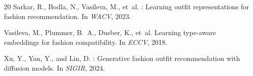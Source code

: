 \documentclass[10pt,twocolumn]{article}
\begin{document}
\begin{thebibliography}{20}
Sarkar, R., Bodla, N., Vasileva, M., et~al.
: Learning outfit representations for fashion
recommendation.
\newblock In \emph{WACV}, 2023.

Vasileva, M., Plummer, B.~A., Dusber, K., et~al.
\newblock Learning type-aware embeddings for fashion compatibility.
\newblock In \emph{ECCV}, 2018.

Xu, Y., Yan, Y., and Lin, D.
: Generative fashion outfit recommendation with
diffusion models.
\newblock In \emph{SIGIR}, 2024.

\end{thebibliography}
\end{document}
